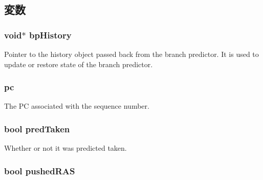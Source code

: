 \subsection{変数}
\hypertarget{structBPredUnit_1_1PredictorHistory_af77971b0f4cc17c0e855b92b1a309983}{
\subsubsection[{bpHistory}]{\setlength{\rightskip}{0pt plus 5cm}void$\ast$ {\bf bpHistory}}}
\label{structBPredUnit_1_1PredictorHistory_af77971b0f4cc17c0e855b92b1a309983}
Pointer to the history object passed back from the branch predictor. It is used to update or restore state of the branch predictor. \hypertarget{structBPredUnit_1_1PredictorHistory_afed6bf9f08aaa7445161a391a719b7e4}{
\subsubsection[{pc}]{ {\bf pc}}}
\label{structBPredUnit_1_1PredictorHistory_afed6bf9f08aaa7445161a391a719b7e4}
The PC associated with the sequence number. \hypertarget{structBPredUnit_1_1PredictorHistory_a27392b4b7d6c2f92585d4a3a4bae5a7b}{
\subsubsection[{predTaken}]{\setlength{\rightskip}{0pt plus 5cm}bool {\bf predTaken}}}
\label{structBPredUnit_1_1PredictorHistory_a27392b4b7d6c2f92585d4a3a4bae5a7b}
Whether or not it was predicted taken. \hypertarget{structBPredUnit_1_1PredictorHistory_aeb0915a8ec4bc79f84faf82333fcbca9}{
\subsubsection[{pushedRAS}]{\setlength{\rightskip}{0pt plus 5cm}bool {\bf pushedRAS}}}
